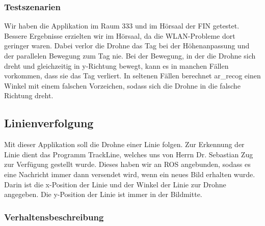 \subsubsection*{Testszenarien }

Wir haben die Applikation im Raum 333 und im Hörsaal der FIN getestet. Bessere Ergebnisse erzielten wir im Hörsaal, da die WLAN-\/Probleme dort geringer waren. Dabei verlor die Drohne das Tag bei der Höhenanpassung und der parallelen Bewegung zum Tag nie. Bei der Bewegung, in der die Drohne sich dreht und gleichzeitig in y-\/Richtung bewegt, kann es in manchen Fällen vorkommen, dass sie das Tag verliert. In seltenen Fällen berechnet ar\_\-recog einen Winkel mit einem falschen Vorzeichen, sodass sich die Drohne in die falsche Richtung dreht.

\subsection*{Linienverfolgung }

Mit dieser Applikation soll die Drohne einer Linie folgen. Zur Erkennung der Linie dient das Programm TrackLine, welches uns von Herrn Dr. Sebastian Zug zur Verfügung gestellt wurde. Dieses haben wir an ROS angebunden, sodass es eine Nachricht immer dann versendet wird, wenn ein neues Bild erhalten wurde. Darin ist die x-\/Position der Linie und der Winkel der Linie zur Drohne angegeben. Die y-\/Position der Linie ist immer in der Bildmitte.

\subsubsection*{Verhaltensbeschreibung }

